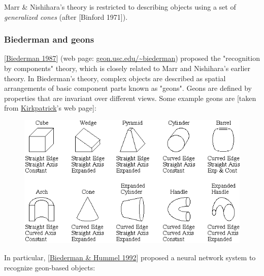  Marr \& Nishihara's theory is restricted  to describing objects using a set of \emph{generalized cones} (after [Binford 1971]).

\subsubsection{Biederman and geons}

[\hyperlink{ref}{Biederman 1987}] (web page: \href{http://geon.usc.edu/~Ebiederman/}{geon.usc.edu/\textasciitilde biederman}) proposed the "recognition by components" theory, which is closely related to Marr and Nishihara's earlier theory. In Biederman's theory, complex objects are described as spatial arrangements of basic component parts known as "geons". Geons are defined by properties that are invariant over different views. Some example geons are [taken from \hyperlink{ref}{Kirkpatrick}'s web page]:

\begin{figure}[H]
\centering
\includegraphics[scale=0.7,bb=0 0 653 322]{geons.PNG}
\end{figure}

In particular, [\hyperlink{ref}{Biederman \& Hummel 1992}] proposed a neural network system to recognize geon-based objects:

